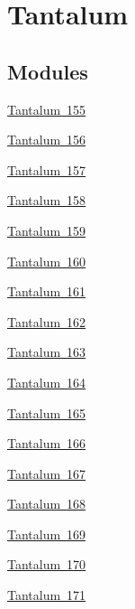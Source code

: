 \hypertarget{group___isotope_const-_tantalum}{}\section{Tantalum}
\label{group___isotope_const-_tantalum}
\subsection*{Modules}
\begin{DoxyCompactItemize}
\item 
\mbox{\hyperlink{group___isotope_const-_tantalum-_ta155}{Tantalum 155}}
\item 
\mbox{\hyperlink{group___isotope_const-_tantalum-_ta156}{Tantalum 156}}
\item 
\mbox{\hyperlink{group___isotope_const-_tantalum-_ta157}{Tantalum 157}}
\item 
\mbox{\hyperlink{group___isotope_const-_tantalum-_ta158}{Tantalum 158}}
\item 
\mbox{\hyperlink{group___isotope_const-_tantalum-_ta159}{Tantalum 159}}
\item 
\mbox{\hyperlink{group___isotope_const-_tantalum-_ta160}{Tantalum 160}}
\item 
\mbox{\hyperlink{group___isotope_const-_tantalum-_ta161}{Tantalum 161}}
\item 
\mbox{\hyperlink{group___isotope_const-_tantalum-_ta162}{Tantalum 162}}
\item 
\mbox{\hyperlink{group___isotope_const-_tantalum-_ta163}{Tantalum 163}}
\item 
\mbox{\hyperlink{group___isotope_const-_tantalum-_ta164}{Tantalum 164}}
\item 
\mbox{\hyperlink{group___isotope_const-_tantalum-_ta165}{Tantalum 165}}
\item 
\mbox{\hyperlink{group___isotope_const-_tantalum-_ta166}{Tantalum 166}}
\item 
\mbox{\hyperlink{group___isotope_const-_tantalum-_ta167}{Tantalum 167}}
\item 
\mbox{\hyperlink{group___isotope_const-_tantalum-_ta168}{Tantalum 168}}
\item 
\mbox{\hyperlink{group___isotope_const-_tantalum-_ta169}{Tantalum 169}}
\item 
\mbox{\hyperlink{group___isotope_const-_tantalum-_ta170}{Tantalum 170}}
\item 
\mbox{\hyperlink{group___isotope_const-_tantalum-_ta171}{Tantalum 171}}
\item 

\end{DoxyCompactItemize}
